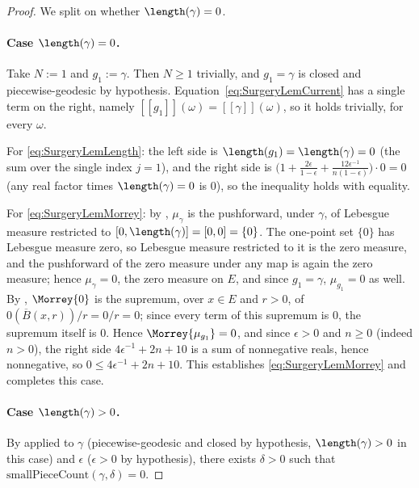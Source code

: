 \begin{proof}
  We split on whether $\length(\gamma) = 0$.

  \paragraph{Case $\length(\gamma) = 0$.} Take $N := 1$ and $g_1 := \gamma$. Then $N\ge1$
  trivially, and $g_1=\gamma$ is closed and piecewise-geodesic by hypothesis.
  Equation~\eqref{eq:SurgeryLemCurrent} has a single term on the right, namely
  $[[g_1]](\omega)=[[\gamma]](\omega)$, so it holds trivially, for every $\omega$.

  For \eqref{eq:SurgeryLemLength}: the left side is $\length(g_1)=\length(\gamma)=0$ (the sum over
  the single index $j=1$), and the right side is
  $\bigl(1+\tfrac{2\epsilon}{1-\epsilon}+\tfrac{12\epsilon^{-1}}{n(1-\epsilon)}\bigr) \cdot 0 = 0$
  (any real factor times $\length(\gamma)=0$ is $0$), so the inequality holds with equality.

  For \eqref{eq:SurgeryLemMorrey}: by , $\mu_\gamma$ is the pushforward,
  under $\gamma$, of Lebesgue measure restricted to $[0,\length(\gamma)]=[0,0]=\{0\}$. The
  one-point set $\{0\}$ has Lebesgue measure zero, so Lebesgue measure restricted to it is the
  zero measure, and the pushforward of the zero measure under any map is again the zero measure;
  hence $\mu_\gamma=0$, the zero measure on $E$, and since $g_1=\gamma$, $\mu_{g_1}=0$ as well. By
  , $\Morrey{0}$ is the supremum, over $x\in E$ and $r>0$, of
  $0(\overline{B}(x,r))/r = 0/r = 0$; since every term of this supremum is $0$, the supremum
  itself is $0$. Hence $\Morrey{\mu_{g_1}}=0$, and since $\epsilon>0$ and $n\ge0$ (indeed $n>0$),
  the right side $4\epsilon^{-1}+2n+10$ is a sum of nonnegative reals, hence nonnegative, so
  $0\le4\epsilon^{-1}+2n+10$. This establishes \eqref{eq:SurgeryLemMorrey} and completes this case.

  \paragraph{Case $\length(\gamma) > 0$.} By  applied to $\gamma$
  (piecewise-geodesic and closed by hypothesis, $\length(\gamma)>0$ in this case) and $\epsilon$
  ($\epsilon>0$ by hypothesis), there exists $\delta>0$ such that
  $\mathrm{smallPieceCount}(\gamma,\delta)=0$.


\end{proof}
